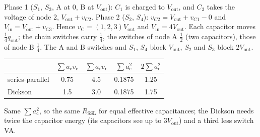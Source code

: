 


\begin{solutionblock}
	Phase 1 ($S_1$, $S_3$, A at 0, B at $V_\mathrm{out}$): $C_1$ is charged to $V_\mathrm{out}$, and $C_3$ takes the voltage of node 2, $V_\mathrm{out}+v_{C2}$. Phase 2 ($S_2$, $S_4$): $v_{C2}=V_\mathrm{out}+v_{C1}-0$ and $V_\mathrm{in}=V_\mathrm{out}+v_{C3}$. Hence $v_\mathrm{C}=(1,2,3)V_\mathrm{out}$ and $V_\mathrm{in}=4V_\mathrm{out}$.
	Each capacitor moves $\tfrac14q_\mathrm{out}$; the chain switches carry $\tfrac14$, the switches of node A $\tfrac12$ (two capacitors), those of node B $\tfrac14$. The A and B switches and $S_1$, $S_4$ block $V_\mathrm{out}$, $S_2$ and $S_3$ block $2V_\mathrm{out}$.

	\begin{center}
		\begin{tabular}{|l|c|c|c|c|}
			\hline
			                & $\sum a_\mathrm{c}v_\mathrm{c}$ & $\sum a_\mathrm{r}v_\mathrm{r}$ & $\sum a_\mathrm{c}^2$ & $2\sum a_\mathrm{r}^2$ \\
			\hline
			series-parallel & 0.75                            & 4.5                             & 0.1875                & 1.25                   \\
			Dickson         & 1.5                             & 3.0                             & 0.1875                & 1.75                   \\
			\hline
		\end{tabular}
		\label{tab:ex11_metrics}
	\end{center}
	Same $\sum a_\mathrm{c}^2$, so the same $R_\mathrm{SSL}$ for equal effective capacitances; the Dickson needs twice the capacitor energy (its capacitors see up to $3V_\mathrm{out}$) and a third less switch VA.
\end{solutionblock}


